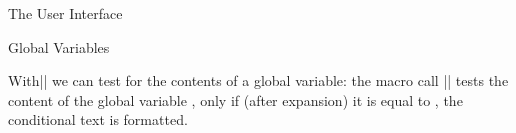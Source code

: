 \begin{sfragment}[id=sec:user]{The User Interface}
\begin{sfragment}[id=sec:user:gvars]{Global Variables}
  \begin{function}{\ifSGvar}
    With|\ifSGvar| we can test for the contents of a global variable: the macro call
    || tests the content of the
    global variable , only if (after expansion) it is equal to , the
    conditional text  is formatted.
  \end{function}
\end{sfragment}
\end{sfragment}


